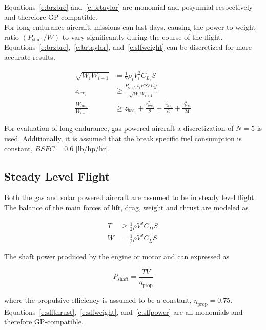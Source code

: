 \documentclass[]{aiaa-tc}%
\begin{document}
    Equations~\eqref{e:brzbre} and~\eqref{e:brtaylor} are monomial and posynmial respectively and therefore GP compatible. \\
    
    For long-endurance aircraft, missions can last days, causing the power to weight ratio $(P_{\text{shaft}}/W)$ to vary significantly during the course of the flight.  Equations~\eqref{e:brzbre},~\eqref{e:brtaylor}, and~\eqref{e:slfweight} can be discretized for more accurate results.

\begin{align}
    \label{e:slfweightd}
    \sqrt{W_i W_{i+1}} &= \frac{1}{2} \rho_i V_i^2 C_{L_i} S \\
    \label{e:brzbred}
    z_{bre_i} &\geq \frac{P_{\text{shaft}_i}t_i BSFC g}{\sqrt{W_i W_{i+1}}}\\
    \label{e:brtaylord}
    \frac{W_{\text{fuel}_i}}{W_{i+1}} &\geq z_{bre_i} + \frac{z_{bre_i}^2}{2} + \frac{z_{bre_i}^3}{6} + \frac{z_{bre_i}^3}{24} 
    \end{align}

    For evaluation of long-endurance, gas-powered aircraft a discretization of $N=5$ is used. Additionally, it is assumed that the break specific fuel consumption is constant, $BSFC = 0.6$ [lb/hp/hr].\cite{bsfcperf}

\subsection{Steady Level Flight}

Both the gas and solar powered aircraft are assumed to be in steady level flight.  The balance of the main forces of lift, drag, weight and thrust are modeled as\cite{hoburgthesis}

\begin{align}
    \label{e:slfthrust}
    T &\geq \frac{1}{2} \rho V^2 C_D S\\
    \label{e:slfweight}
    W &= \frac{1}{2} \rho V^2 C_L S . 
\end{align}

The shaft power produced by the engine or motor and can expressed as  

\begin{equation}
    \label{e:slfpower}
    P_{\text{shaft}} = \frac{TV}{\eta_{\text{prop}}}
    \end{equation}

    where the propulsive efficiency is assumed to be a constant, $\eta_{\text{prop}} = 0.75$. Equations~\eqref{e:slfthrust},~\eqref{e:slfweight}, and~\eqref{e:slfpower} are all monomials and therefore GP-compatible.
\end{document}
